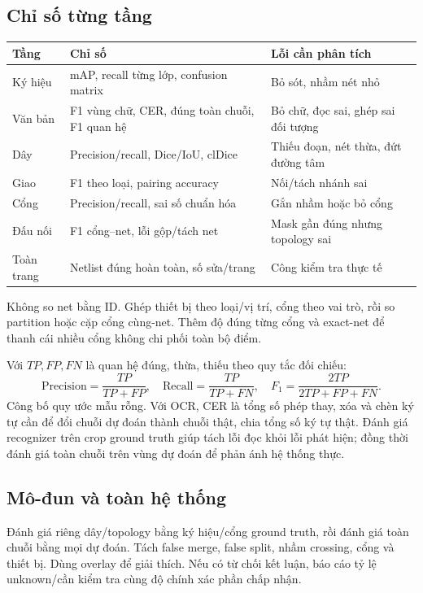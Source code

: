 \documentclass[11pt,a4paper]{article}
\begin{document}
\subsection{Chỉ số từng tầng}
\begin{center}
\small
\begin{tabularx}{\linewidth}{L{2.3cm}YY}
\toprule
Tầng & Chỉ số & Lỗi cần phân tích\\
\midrule
Ký hiệu & mAP, recall từng lớp, confusion matrix & Bỏ sót, nhầm nét nhỏ\\
Văn bản & F1 vùng chữ, CER, đúng toàn chuỗi, F1 quan hệ & Bỏ chữ, đọc sai, ghép sai đối tượng\\
Dây & Precision/recall, Dice/IoU, clDice & Thiếu đoạn, nét thừa, đứt đường tâm\\
Giao & F1 theo loại, pairing accuracy & Nối/tách nhánh sai\\
Cổng & Precision/recall, sai số chuẩn hóa & Gắn nhầm hoặc bỏ cổng\\
Đấu nối & F1 cổng--net, lỗi gộp/tách net & Mask gần đúng nhưng topology sai\\
Toàn trang & Netlist đúng hoàn toàn, số sửa/trang & Công kiểm tra thực tế\\
\bottomrule
\end{tabularx}
\end{center}
Không so net bằng ID. Ghép thiết bị theo loại/vị trí, cổng theo vai trò, rồi so partition hoặc cặp cổng cùng-net. Thêm độ đúng từng cổng và exact-net để thanh cái nhiều cổng không chi phối toàn bộ điểm.

Với $TP,FP,FN$ là quan hệ đúng, thừa, thiếu theo quy tắc đối chiếu:
\begin{equation}
\mathrm{Precision}=\frac{TP}{TP+FP},\quad
\mathrm{Recall}=\frac{TP}{TP+FN},\quad
F_1=\frac{2TP}{2TP+FP+FN}.
\end{equation}
Công bố quy ước mẫu rỗng. Với OCR, CER là tổng số phép thay, xóa và chèn ký tự cần để đổi chuỗi dự đoán thành chuỗi thật, chia tổng số ký tự thật. Đánh giá recognizer trên crop ground truth giúp tách lỗi đọc khỏi lỗi phát hiện; đồng thời đánh giá toàn chuỗi trên vùng dự đoán để phản ánh hệ thống thực.

\subsection{Mô-đun và toàn hệ thống}
Đánh giá riêng dây/topology bằng ký hiệu/cổng ground truth, rồi đánh giá toàn chuỗi bằng mọi dự đoán. Tách false merge, false split, nhầm crossing, cổng và thiết bị. Dùng overlay để giải thích. Nếu có từ chối kết luận, báo cáo tỷ lệ unknown/cần kiểm tra cùng độ chính xác phần chấp nhận.
\end{document}
